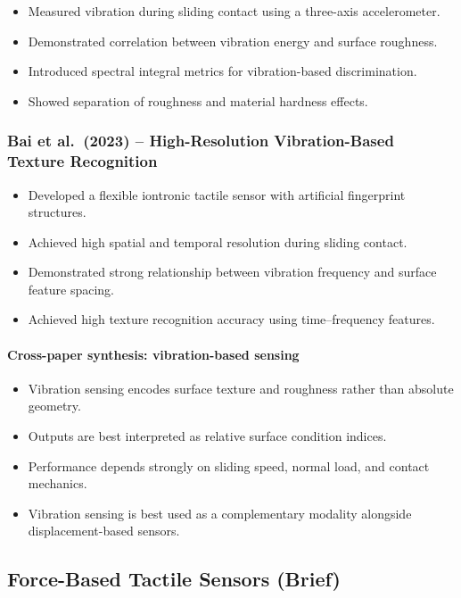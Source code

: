 \documentclass[11pt,a4paper]{article}
\begin{document}
\begin{itemize}
    \item Measured vibration during sliding contact using a three-axis accelerometer.
    \item Demonstrated correlation between vibration energy and surface roughness.
    \item Introduced spectral integral metrics for vibration-based discrimination.
    \item Showed separation of roughness and material hardness effects.
\end{itemize}

\subsubsection*{Bai et al.\ (2023) -- High-Resolution Vibration-Based Texture Recognition}

\begin{itemize}
    \item Developed a flexible iontronic tactile sensor with artificial fingerprint structures.
    \item Achieved high spatial and temporal resolution during sliding contact.
    \item Demonstrated strong relationship between vibration frequency and surface feature spacing.
    \item Achieved high texture recognition accuracy using time–frequency features.
\end{itemize}

\paragraph{Cross-paper synthesis: vibration-based sensing}
\begin{itemize}
    \item Vibration sensing encodes surface texture and roughness rather than absolute geometry.
    \item Outputs are best interpreted as relative surface condition indices.
    \item Performance depends strongly on sliding speed, normal load, and contact mechanics.
    \item Vibration sensing is best used as a complementary modality alongside displacement-based sensors.
\end{itemize}

\subsection{Force-Based Tactile Sensors (Brief)}
\end{document}
